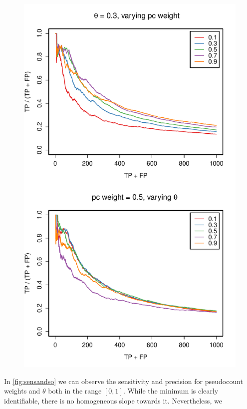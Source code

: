 \documentclass[11pt]{article}\usepackage[]{graphicx}\usepackage[]{color}
\makeatletter
\def\maxwidth{ %
  \ifdim\Gin@nat@width>\linewidth
    \linewidth
  \else
    \Gin@nat@width
  \fi
}
\theoremstyle{plain}
\makeatother
\begin{document}
\begin{multicols*}{2}
\begin{Schunk}
\begin{figure}[H]
{\centering \includegraphics[width=\maxwidth]{figure/twocolumn-varying-1} 

}

\caption[ ]{ }\label{fig:varying}
\end{figure}
\end{Schunk}
	
	In \cref{fig:sensandso} we can observe the sensitivity and precision for pseudocount weights and $\theta$ both in the range $[0, 1]$. While the minimum is clearly identifiable, there is no homogeneous slope towards it. Nevertheless, we 
	

\end{multicols*}
\end{document}
